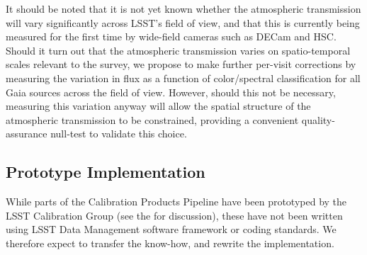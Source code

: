 It should be noted that it is not yet known whether the atmospheric transmission will vary significantly across LSST's field of view, and that this is currently being measured for the first time by wide-field cameras such as DECam and HSC. Should it turn out that the atmospheric transmission varies on spatio-temporal scales relevant to the survey, we propose to make further per-visit corrections by measuring the variation in flux as a function of color/spectral classification for all Gaia sources across the field of view. However, should this not be necessary, measuring this variation anyway will allow the spatial structure of the atmospheric transmission to be constrained, providing a convenient quality-assurance null-test to validate this choice.









\subsection{Prototype Implementation}
\label{sec:CPP:prototypeImplementation}
While parts of the Calibration Products Pipeline have been prototyped by the LSST Calibration Group (see the \NewPCP for discussion), these have not been written using LSST Data Management software framework or coding standards. We therefore expect to transfer the know-how, and rewrite the implementation.












